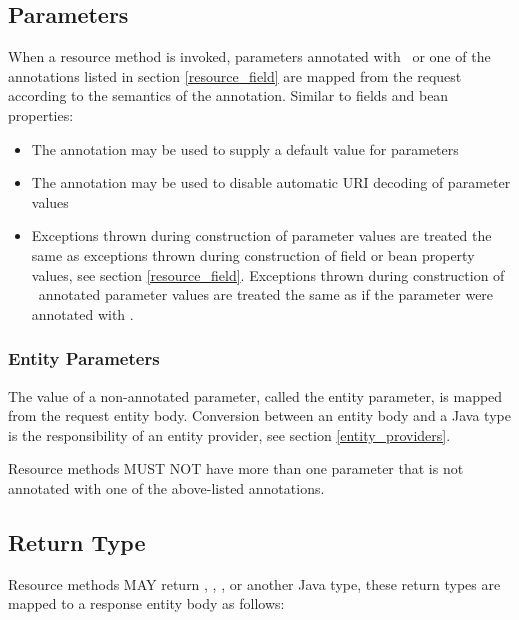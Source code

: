 \subsection{Parameters}
\label{resource_method_params}

When a resource method is invoked, parameters annotated with \FormParam\ or one of the  annotations listed in section \ref{resource_field} are mapped from the request according to the semantics of the annotation. Similar to fields and bean properties:
\begin{itemize}
\item The  annotation may be used to supply a default value for parameters
\item The  annotation may be used to disable automatic URI decoding of parameter values
\item Exceptions thrown during construction of parameter values are treated the same as exceptions thrown during construction of field or bean property values, see section \ref{resource_field}. Exceptions thrown during construction of \FormParam\ annotated parameter values are treated the same as if the parameter were annotated with \HeaderParam.
\end{itemize}

\subsubsection{Entity Parameters}

The value of a non-annotated parameter, called the entity parameter, is mapped from the request entity body. Conversion between an entity body and a Java type is the responsibility of an entity provider, see section \ref{entity_providers}.

Resource methods MUST NOT have more than one parameter that is not annotated with one of the above-listed annotations.

\subsection{Return Type}
\label{resource_method_return}

Resource methods MAY return , \Response, , or another Java type, these return types are mapped to a response entity body as follows:

